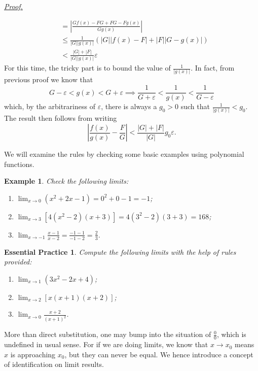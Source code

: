 \documentclass[12pt]{article}
\newtheorem*{example}{Example}
\newtheorem{exercise}{Essential Practice}[section]
\renewenvironment{proof}[1][Proof]{\begin{snugshade*} \underline{\textit{{#1}.}}\\}{\hfill \qedsymbol \end{snugshade*}}
\begin{document}
\begin{proof}
\begin{enumerate}
\begin{align*}
                &=|\frac{Gf(x)-FG+FG-Fg(x)}{Gg(x)}|\\
                &\leq \frac{1}{|G||g(x)|}(|G||f(x)-F|+|F||G-g(x)|)\\
                &<\frac{|G|+|F|}{|G||g(x)|}\varepsilon
            \end{align*}
            For this time, the tricky part is to bound the value of $\frac{1}{|g(x)|}$. In fact, from previous proof we know that \[G-\varepsilon<g(x)<G+\varepsilon \implies \frac{1}{G+\varepsilon}<\frac{1}{g(x)}<\frac{1}{G-\varepsilon}\] which, by the arbitrariness of $\varepsilon$, there is always a $g_0>0$ such that $\frac{1}{|g(x)|}<g_0$. The result then follows from writing \[|\frac{f(x)}{g(x)}-\frac{F}{G}|<\frac{|G|+|F|}{|G|}g_0\varepsilon.\]
        \end{enumerate}
    \end{proof}

    We will examine the rules by checking some basic examples using polynomial functions.

    \begin{example}
        Check the following limits:\begin{enumerate}
            \item $\displaystyle\lim_{x\to 0}(x^2+2x-1)=0^2+0-1=-1$;
            \item $\displaystyle\lim_{x\to 3}[4(x^2-2)(x+3)]=4(3^2-2)(3+3)=168$;
            \item $\displaystyle\lim_{x\to -1}\frac{x-1}{x-2}=\frac{-1-1}{-1-2}=\frac{2}{3}$.
        \end{enumerate}
    \end{example}

    \begin{exercise}
        Compute the following limits with the help of rules provided:\begin{enumerate}
            \item $\displaystyle\lim_{x\to 1}(3x^2-2x+4)$;
            \item $\displaystyle\lim_{x\to 2}[x(x+1)(x+2)]$;
            \item $\displaystyle\lim_{x\to 0}\frac{x+2}{(x+1)^2}$.
        \end{enumerate}
    \end{exercise}

    More than direct substitution, one may bump into the situation of $\frac{0}{0}$, which is undefined in usual sense. For if we are doing limits, we know that $x\to x_0$ means $x$ is approaching $x_0$, but they can never be equal. We hence introduce a concept of identification on limit results.
\end{document}
